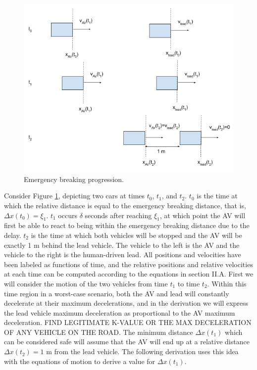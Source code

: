 \documentclass[conference]{IEEEtran}
\begin{document}
\begin{appendix}
\begin{figure}[htbp]
\centerline{\includegraphics[width=6 in]{xiDerivation.png}}
\caption{Emergency breaking progression.}
\label{fig2}
\end{figure}

Consider Figure \ref{fig2}, depicting two cars at times $t_0$, $t_1$, and $t_2$. $t_0$ is the time at which the relative distance is equal to the emergency breaking distance, that is, $\Delta x(t_0)=\xi_1$. $t_1$ occurs $\delta$ seconds after reaching $\xi_1$, at which point the AV will first be able to react to being within the emergency breaking distance due to the delay. $t_2$ is the time at which both vehicles will be stopped and the AV will be exactly 1 m behind the lead vehicle. The vehicle to the left is the AV and the vehicle to the right is the human-driven lead. All positions and velocities have been labeled as functions of time, and the relative positions and relative velocities at each time can be computed according to the equations in section II.A. First we will consider the motion of the two vehicles from time $t_1$ to time $t_2$. Within this time region in a worst-case scenario, both the AV and lead will constantly decelerate at their maximum decelerations, and in the derivation we will express the lead vehicle maximum deceleration as proportional to the AV maximum deceleration. FIND LEGITIMATE K-VALUE OR THE MAX DECELERATION OF ANY VEHICLE ON THE ROAD. The minimum distance $\Delta x(t_1)$ which can be considered safe will assume that the AV will end up at a relative distance $\Delta x(t_2)= 1$ m from the lead vehicle. The following derivation uses this idea with the equations of motion to derive a value for $\Delta x(t_1)$.


\end{appendix}
\end{document}
